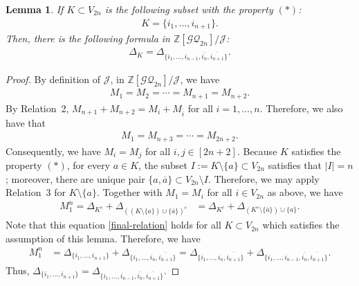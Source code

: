 \documentclass[12pt]{amsart}
\newtheorem{lemma}[theorem]{Lemma}
\theoremstyle{remark}
\numberwithin{equation}{section}
\begin{document}
\begin{lemma}
\label{final-lemma}
If $K\subset V_{2n}$ is the following subset with the property $(\ast)$:
\begin{align*}
K=\{i_{1},\ldots, i_{n+1}\}.
\end{align*}
Then, there is
the following formula in $\mathbb{Z}[\mathcal{GQ}_{2n}]/\mathcal{J}$:
\begin{align*}
\Delta_{K}=\Delta_{\{i_{1},\ldots,i_{n-1},\overline{i_{n}},\overline{i_{n+1}}\}}.
\end{align*}
\end{lemma} 
\begin{proof}
By definition of $\mathcal{J}$, 
in $\mathbb{Z}[\mathcal{GQ}_{2n}]/\mathcal{J}$,
we have 
\begin{align*}
M_{1}=M_{2}=\cdots =M_{n+1}=M_{n+2}.
\end{align*}
By Relation~2, $M_{n+1}+M_{n+2}=M_{i}+M_{\overline{i}}$ for all $i=1,\ldots, n$.
Therefore, we also have that 
\begin{align*}
M_{1}=M_{n+3}=\cdots =M_{2n+2}.
\end{align*}
Consequently, we have $M_{i}=M_{j}$ for all $i,j\in [2n+2]$.
Because $K$ satisfies the property $(\ast)$, 
 for every $a\in K$, the subset $I:=K\setminus\{a\}\subset V_{2n}$ satisfies that $|I|=n$; moreover, there are unique pair $\{a,\overline{a}\}\subset V_{2n}\setminus I$.
Therefore, we may apply Relation~3 for $K\setminus\{a\}$.
Together with $M_{1}=M_{i}$ for all $i\in V_{2n}$ as above, we have 
\begin{align}
\label{final-relation}
M_{1}^{n}=\Delta_{K^{c}}+\Delta_{((K\setminus\{a\})\cup \{\overline{a}\})^{c}}&=\Delta_{K^{c}}+\Delta_{(K^{c}\setminus\{\overline{a}\})\cup \{a\}}.
\end{align}
Note that this equation \eqref{final-relation} holds for all $K\subset V_{2n}$ which satisfies the assumption of this lemma.
Therefore, we have 
\begin{align*}
M_{1}^{n}&=\Delta_{\{i_{1},\ldots, i_{n+1}\}}+\Delta_{\{i_{1},\ldots, i_{n}, \overline{i_{n+1}}\}}=\Delta_{\{i_{1},\ldots, i_{n}, \overline{i_{n+1}}\}}+\Delta_{\{i_{1},\ldots,i_{n-1}, \overline{i_{n}},\overline{i_{n+1}}\}}.
\end{align*}
Thus, 
$\Delta_{\{i_{1},\ldots, i_{n+1}\}}=\Delta_{\{i_{1},\ldots,i_{n-1}, \overline{i_{n}},\overline{i_{n+1}}\}}$.
\end{proof}
\end{document}
